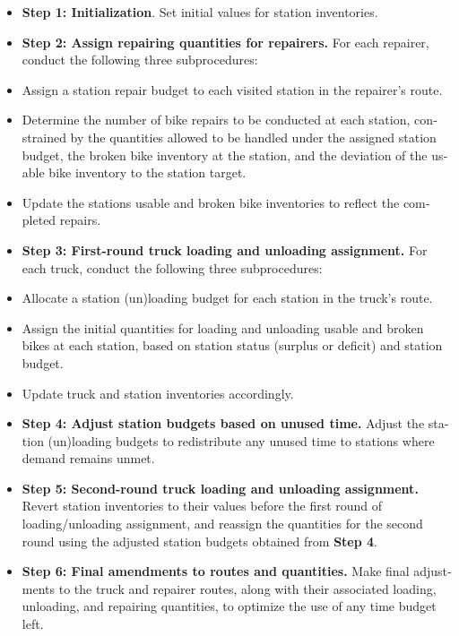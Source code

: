 \documentclass[
  english,
]{article}
\begin{document}
\begin{otherlanguage}{english}
\begin{itemize}
\item
  \protect{}\label{p0395}
  \textbf{Step 1: Initialization}. Set initial values for station inventories.
\item
  \protect{}\label{p0400}
  \textbf{Step 2: Assign repairing quantities for repairers.} For each repairer, conduct the
  following three subprocedures:
\item
  \protect{}\label{p0405}
  Assign a station repair budget to each visited station in the repairer's route.
\item
  \protect{}\label{p0410}
  Determine the number of bike repairs to be conducted at each station, constrained by the
  quantities allowed to be handled under the assigned station budget, the broken bike inventory at
  the station, and the deviation of the usable bike inventory to the station target.
\item
  \protect{}\label{p0415}
  Update the station\textquotesingle s usable and broken bike inventories to reflect the completed
  repairs.
\item
  \protect{}\label{p0420}
  \textbf{Step 3: First-round truck loading and unloading assignment.} For each truck, conduct the
  following three subprocedures:
\item
  \protect{}\label{p0425}
  Allocate a station (un)loading budget for each station in the truck's route.
\item
  \protect{}\label{p0430}
  Assign the initial quantities for loading and unloading usable and broken bikes at each station,
  based on station status (surplus or deficit) and station budget.
\item
  \protect{}\label{p0435}
  Update truck and station inventories accordingly.
\item
  \protect{}\label{p0440}
  \textbf{Step 4: Adjust station budgets based on unused time.} Adjust the station (un)loading
  budgets to redistribute any unused time to stations where demand remains unmet.
\item
  \protect{}\label{p0445}
  \textbf{Step 5: Second-round truck loading and unloading assignment.} Revert station inventories
  to their values before the first round of loading/unloading assignment, and reassign the
  quantities for the second round using the adjusted station budgets obtained from \textbf{Step 4}.
\item
  \protect{}\label{p0450}
  \textbf{Step 6: Final amendments to routes and quantities.} Make final adjustments to the truck
  and repairer routes, along with their associated loading, unloading, and repairing quantities, to
  optimize the use of any time budget left.
\end{itemize}


\end{otherlanguage}
\end{document}
